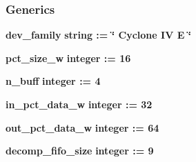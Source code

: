 \subsubsection*{Generics}
 \begin{DoxyCompactItemize}
\item 
{\bf dev\+\_\+family} {\bfseries {\bfseries \textcolor{comment}{string}\textcolor{vhdlchar}{ }\textcolor{vhdlchar}{ }\textcolor{vhdlchar}{\+:}\textcolor{vhdlchar}{=}\textcolor{vhdlchar}{ }\textcolor{vhdlchar}{ }\textcolor{vhdlchar}{ }\textcolor{vhdlchar}{ }\textcolor{keyword}{\char`\"{} Cyclone I\+V E \char`\"{}}\textcolor{vhdlchar}{ }}}
\item 
{\bf pct\+\_\+size\+\_\+w} {\bfseries {\bfseries \textcolor{comment}{integer}\textcolor{vhdlchar}{ }\textcolor{vhdlchar}{ }\textcolor{vhdlchar}{\+:}\textcolor{vhdlchar}{=}\textcolor{vhdlchar}{ }\textcolor{vhdlchar}{ } \textcolor{vhdldigit}{16} \textcolor{vhdlchar}{ }}}
\item 
{\bf n\+\_\+buff} {\bfseries {\bfseries \textcolor{comment}{integer}\textcolor{vhdlchar}{ }\textcolor{vhdlchar}{ }\textcolor{vhdlchar}{\+:}\textcolor{vhdlchar}{=}\textcolor{vhdlchar}{ }\textcolor{vhdlchar}{ } \textcolor{vhdldigit}{4} \textcolor{vhdlchar}{ }}}
\item 
{\bf in\+\_\+pct\+\_\+data\+\_\+w} {\bfseries {\bfseries \textcolor{comment}{integer}\textcolor{vhdlchar}{ }\textcolor{vhdlchar}{ }\textcolor{vhdlchar}{\+:}\textcolor{vhdlchar}{=}\textcolor{vhdlchar}{ }\textcolor{vhdlchar}{ } \textcolor{vhdldigit}{32} \textcolor{vhdlchar}{ }}}
\item 
{\bf out\+\_\+pct\+\_\+data\+\_\+w} {\bfseries {\bfseries \textcolor{comment}{integer}\textcolor{vhdlchar}{ }\textcolor{vhdlchar}{ }\textcolor{vhdlchar}{\+:}\textcolor{vhdlchar}{=}\textcolor{vhdlchar}{ }\textcolor{vhdlchar}{ } \textcolor{vhdldigit}{64} \textcolor{vhdlchar}{ }}}
\item 
{\bf decomp\+\_\+fifo\+\_\+size} {\bfseries {\bfseries \textcolor{comment}{integer}\textcolor{vhdlchar}{ }\textcolor{vhdlchar}{ }\textcolor{vhdlchar}{\+:}\textcolor{vhdlchar}{=}\textcolor{vhdlchar}{ }\textcolor{vhdlchar}{ } \textcolor{vhdldigit}{9} \textcolor{vhdlchar}{ }}}
\end{DoxyCompactItemize}
